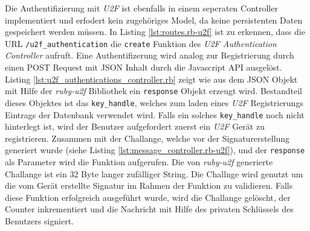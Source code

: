 \documentclass[11pt,a4paper,ngerman]{scrreprt}
\begin{document}
Die Authentifizierung mit \textit{U2F} ist ebenfalls in einem seperaten Controller implementiert und erfodert kein zugehöriges Model, da keine persistenten Daten gespeichert werden müssen. In Listing \ref{lst:routes.rb-u2f} ist zu erkennen, dass die URL \texttt{/u2f\_authentication} die \texttt{create} Funktion des \textit{U2F Authentication Controller} aufruft. Eine Authentifizerung wird analog zur Registrierung durch einen POST Request mit JSON Inhalt durch die Javascript API ausgelöst. Listing \ref{lst:u2f_authentications_controller.rb} zeigt wie aus dem JSON Objekt mit Hilfe der \textit{ruby-u2f} Bibliothek ein \texttt{response} Objekt erzeugt wird. Bestandteil dieses Objektes ist das \texttt{key\_handle}, welches zum laden eines \textit{U2F} Registrierungs Eintrags der Datenbank verwendet wird. Falls ein solches \texttt{key\_handle} noch nicht hinterlegt ist, wird der Benutzer aufgefordert zuerst ein \textit{U2F} Gerät zu registrieren. Zusammen mit der Challange, welche vor der Signaturerstellung generiert wurde (siehe Listing \ref{lst:message_controller.rb-u2f}), und der \texttt{response} als Parameter wird die  Funktion aufgerufen. Die von \textit{ruby-u2f} generierte Challange ist ein 32 Byte langer zufälliger String. Die Challnge wird genutzt um die vom Gerät erstellte Signatur im Rahmen der  Funktion zu validieren. Falls diese Funktion erfolgreich ausgeführt wurde, wird die Challange gelöscht, der Counter inkrementiert und die Nachricht mit Hilfe des privaten Schlüssels des Benutzers signiert.
\end{document}
